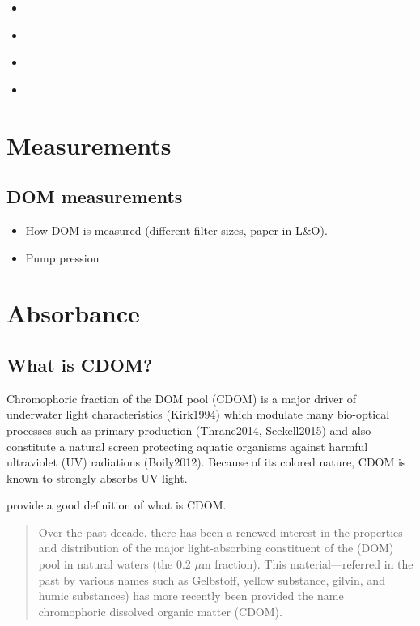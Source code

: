 \documentclass[]{book}
\providecommand{\tightlist}{%
  \setlength{\itemsep}{0pt}\setlength{\parskip}{0pt}}
\theoremstyle{definition}
\theoremstyle{definition}
\theoremstyle{remark}
\begin{document}
\begin{itemize}
\tightlist
\item
  \citet{Lakowicz2006}
\item
  \citet{Hansell2014}
\item
  \citet{Findlay2003}
\item
  \citet{Coble2014}
\end{itemize}

\chapter{Measurements}\label{measurements}

\section{DOM measurements}\label{dom-measurements}

\begin{itemize}
\tightlist
\item
  How DOM is measured (different filter sizes, paper in L\&O).
\item
  Pump pression
\end{itemize}

\chapter{Absorbance}\label{absorbance}

\section{What is CDOM?}\label{what-is-cdom}

Chromophoric fraction of the DOM pool (CDOM) is a major driver of
underwater light characteristics (Kirk1994) which modulate many
bio-optical processes such as primary production (Thrane2014,
Seekell2015) and also constitute a natural screen protecting aquatic
organisms against harmful ultraviolet (UV) radiations (Boily2012).
Because of its colored nature, CDOM is known to strongly absorbs UV
light.

\citet{Blough2002} provide a good definition of what is CDOM.

\begin{quote}
Over the past decade, there has been a renewed interest in the
properties and distribution of the major light-absorbing constituent of
the (DOM) pool in natural waters (the 0.2 \(μ\)m fraction). This
material---referred in the past by various names such as Gelbstoff,
yellow substance, gilvin, and humic substances) has more recently been
provided the name chromophoric dissolved organic matter (CDOM).
\end{quote}
\end{document}
